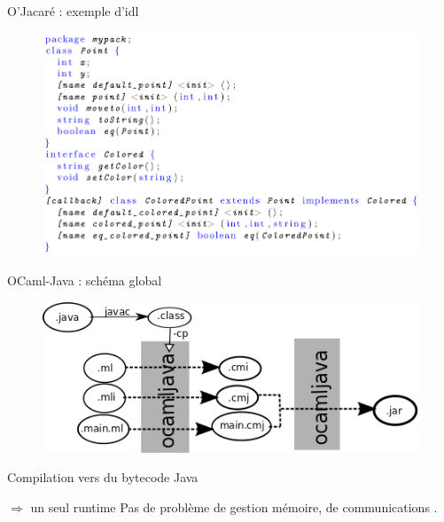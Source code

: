 \documentclass{beamer}
\begin{document}
\begin{frame}{O'Jacaré : exemple d'idl}
  
\begin{figure}[h]
  \centering
  \includegraphics[scale=0.35]{pointIdlEx.png}
\end{figure}
\end{frame}




\begin{frame}{OCaml-Java : schéma global}
\begin{figure}
  \centering
  \includegraphics[scale=0.5]{schemaOCamlJava.png}
\end{figure}
Compilation vers du bytecode Java

$\Rightarrow$ un seul runtime
Pas de problème de gestion mémoire, de communications .
\end{frame}
\end{document}
